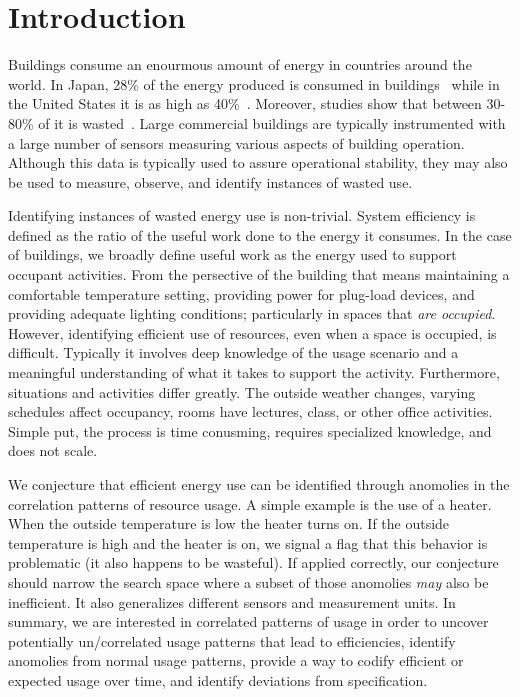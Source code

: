 \section{Introduction}
Buildings consume an enourmous amount of energy in countries around the world.  In 
Japan, 28\% of the energy produced is consumed in buildings~\cite{japanbuildings} while in the United 
States it is as high as 40\%~\cite{epabuildings}.  Moreover, studies show that between 30-80\% of it
is wasted~\cite{waste_science, next10_waste}.  Large commercial buildings are typically instrumented
with a large number of sensors measuring various aspects of building operation.  Although this data is
typically used to assure operational stability, they may also be used to measure, observe, and identify
instances of wasted use.

Identifying instances of wasted energy use is non-trivial.  System efficiency is defined as the ratio of the 
useful work done to the energy it consumes.  In the case of buildings, we broadly define useful work as 
the energy used to support occupant activities.  From the persective of the building that means maintaining
a comfortable temperature setting, providing power for plug-load devices, and providing adequate lighting
conditions; particularly in spaces that \emph{are occupied}.  However, identifying efficient use of resources,
even when a space is occupied, is difficult.  Typically it involves deep knowledge of the usage scenario and
a meaningful understanding of what it takes to support the activity.  Furthermore, situations and activities differ
greatly.  The outside weather changes, varying schedules affect occupancy, rooms have lectures, class,
or other office activities.  Simple put, the process is time conusming, requires specialized knowledge,
and does not scale.

We conjecture that efficient energy use can be identified through anomolies in the correlation
patterns of resource usage.  A simple example is the use of a heater.  When the outside temperature is low
the heater turns on.  If the outside temperature is high and the heater is on, we signal a flag that this
behavior is problematic (it also happens to be wasteful).  If applied correctly, our conjecture should narrow
the search space where a subset of those anomolies \emph{may} also be inefficient.
It also generalizes different sensors and measurement units.  In summary, we are interested
in correlated patterns of usage in order to uncover potentially un/correlated usage patterns 
that lead to efficiencies, identify anomolies from normal usage patterns, provide a way to codify efficient 
or expected usage over time, and identify deviations from specification.


